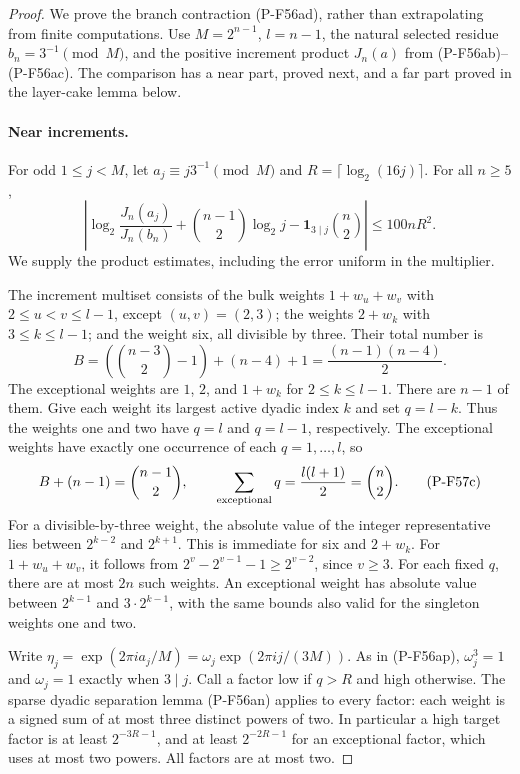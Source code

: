 \begin{proof}
We prove the branch contraction (P-F56ad), rather than
extrapolating from finite computations.
Use $M=2^{n-1}$, $l=n-1$, the natural selected residue
$b_n=3^{-1}\pmod M$, and the positive increment product
$J_n(a)$ from (P-F56ab)--(P-F56ac).
The comparison has a near part, proved next, and a far part
proved in the layer-cake lemma below.

\paragraph{Near increments.}
For odd $1\le j<M$, let
$a_j\equiv j3^{-1}\pmod M$ and
$R=\lceil\log_2(16j)\rceil$. For all $n\ge5$,
\[
 \left|
 \log_2\frac{J_n(a_j)}{J_n(b_n)}
 +\binom{n-1}2\log_2j
 -\mathbf1_{3\mid j}\binom n2
 \right|\le100nR^2.
 \tag{P-F57b}
\]
We supply the product estimates, including the error uniform
in the multiplier.

The increment multiset consists of the bulk weights
$1+w_u+w_v$ with $2\le u<v\le l-1$, except $(u,v)=(2,3)$;
the weights $2+w_k$ with $3\le k\le l-1$; and the weight
six, all divisible by three. Their total number is
\[
 B=\left(\binom{n-3}2-1\right)+(n-4)+1
                         =\frac{(n-1)(n-4)}2.
 \]
The exceptional weights are
$1$, $2$, and $1+w_k$ for $2\le k\le l-1$.
There are $n-1$ of them.
Give each weight its largest active dyadic index $k$ and set
$q=l-k$. Thus the weights one and two have $q=l$ and
$q=l-1$, respectively.
The exceptional weights have exactly one occurrence of
each $q=1,\ldots,l$, so
\[
 B+(n-1)=\binom{n-1}2,\qquad
 \sum_{\rm exceptional}q=\frac{l(l+1)}2=\binom n2.
 \tag{P-F57c}
\]
For a divisible-by-three weight, the absolute value of the
integer representative lies between $2^{k-2}$ and
$2^{k+1}$. This is immediate for six and $2+w_k$.
For $1+w_u+w_v$, it follows from
$2^v-2^{v-1}-1\ge2^{v-2}$, since $v\ge3$.
For each fixed $q$, there are at most $2n$ such weights.
An exceptional weight has absolute value between
$2^{k-1}$ and $3\cdot2^{k-1}$, with the same bounds
also valid for the singleton weights one and two.

Write
$\eta_j=\exp(2\pi ia_j/M)
        =\omega_j\exp(2\pi ij/(3M))$.
As in (P-F56ap), $\omega_j^3=1$ and
$\omega_j=1$ exactly when $3\mid j$.
Call a factor low if $q>R$ and high otherwise.
The sparse dyadic separation lemma (P-F56an) applies
to every factor: each weight is a signed sum of at most
three distinct powers of two.
In particular a high target factor is at least
$2^{-3R-1}$, and at least $2^{-2R-1}$ for an
exceptional factor, which uses at most two powers.
All factors are at most two.


\end{proof}
